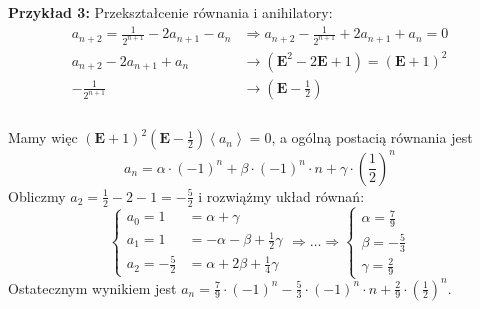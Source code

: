 \documentclass[a4paper,12pt]{article}
\newcommand{\annihilator}{\mathbf{E}}					%
\newcommand{\sequence}[1]{\left\langle #1 \right\rangle} %
\begin{document}
\noindent \textbf{Przykład 3:} Przekształcenie równania i anihilatory:
\begin{align*}
	a_{n+2} = \frac{1}{2^{n+1}} - 2 a_{n+1} - a_n 	&\Longrightarrow a_{n+2} - \frac{1}{2^{n+1}} + 2 a_{n+1} + a_n = 0 \\
	a_{n+2} - 2 a_{n+1} + a_{n} 					&\longrightarrow (\annihilator^2 - 2\annihilator + 1) = (\annihilator + 1)^2  \\
	-\frac{1}{2^{n+1}}								&\longrightarrow \left(\annihilator - \frac{1}{2}\right) \\
\end{align*}\\[-30pt]
Mamy więc $(\annihilator + 1)^2 \left(\annihilator - \frac{1}{2}\right) \sequence{a_n} = 0$, a ogólną postacią równania jest
\[ a_n = \alpha \cdot (-1)^n + \beta \cdot (-1)^n \cdot n + \gamma \cdot \left(\frac{1}{2}\right)^n  \]
Obliczmy $a_2 = \frac{1}{2} - 2 - 1 = -\frac{5}{2}$ i rozwiążmy układ równań:
\[
	\begin{cases}
		a_0 = 1 			&= \alpha + \gamma \\
		a_1 = 1 			&= -\alpha - \beta + \frac{1}{2} \gamma \\
		a_2 = -\frac{5}{2} 	&= \alpha + 2 \beta + \frac{1}{4} \gamma 
	\end{cases}	
	\Rightarrow
	\ldots
	\Rightarrow
	\begin{cases}
		\alpha = \frac{7}{9}\\
		\beta  = - \frac{5}{3}\\
		\gamma = \frac{2}{9}
	\end{cases}
\]
Ostatecznym wynikiem jest $a_n = \frac{7}{9} \cdot (-1)^n - \frac{5}{3} \cdot (-1)^n \cdot n + \frac{2}{9} \cdot \left(\frac{1}{2}\right)^n$.
\end{document}
